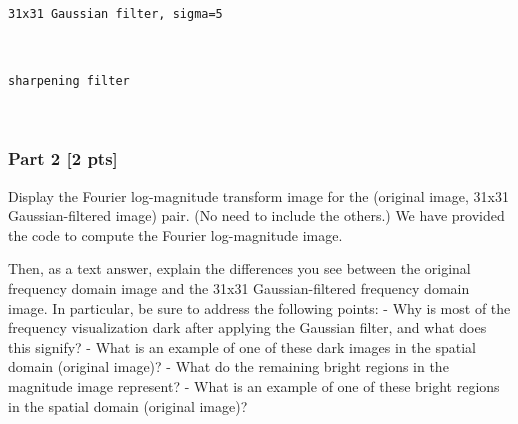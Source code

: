 \documentclass[11pt]{article}
\begin{document}
    \begin{Verbatim}[commandchars=\\\{\}]
31x31 Gaussian filter, sigma=5
    \end{Verbatim}

    \begin{center}
    \end{center}
    { \hspace*{\fill} \\}
    
    \begin{Verbatim}[commandchars=\\\{\}]
sharpening filter
    \end{Verbatim}

    \begin{center}
    \end{center}
    { \hspace*{\fill} \\}
    
    \hypertarget{part-2-2-pts}{%
\subsubsection{Part 2 {[}2 pts{]}}\label{part-2-2-pts}}

Display the Fourier log-magnitude transform image for the (original
image, 31x31 Gaussian-filtered image) pair. (No need to include the
others.) We have provided the code to compute the Fourier log-magnitude
image.

Then, as a text answer, explain the differences you see between the
original frequency domain image and the 31x31 Gaussian-filtered
frequency domain image. In particular, be sure to address the following
points: - Why is most of the frequency visualization dark after applying
the Gaussian filter, and what does this signify? - What is an example of
one of these dark images in the spatial domain (original image)? - What
do the remaining bright regions in the magnitude image represent? - What
is an example of one of these bright regions in the spatial domain
(original image)?
\end{document}
